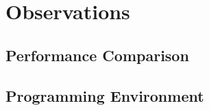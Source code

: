 \documentclass{article}
\begin{document}
\section{Observations}

\subsection{Performance Comparison}

\subsection{Programming Environment}

%
%
\end{document}
